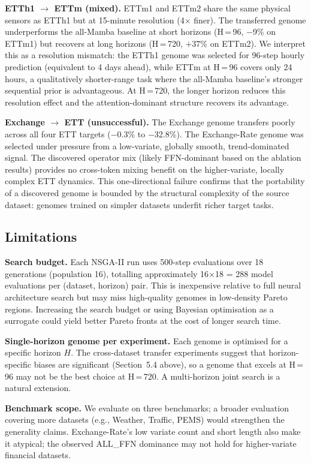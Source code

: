 \textbf{ETTh1 $\to$ ETTm (mixed).}
ETTm1 and ETTm2 share the same physical sensors as ETTh1 but at 15-minute resolution (4$\times$ finer).
The transferred genome underperforms the all-Mamba baseline at short horizons (H\,=\,96, $-$9\% on ETTm1) but recovers at long horizons (H\,=\,720, $+$37\% on ETTm2).
We interpret this as a resolution mismatch: the ETTh1 genome was selected for 96-step hourly prediction (equivalent to 4 days ahead), while ETTm at H\,=\,96 covers only 24 hours, a qualitatively shorter-range task where the all-Mamba baseline's stronger sequential prior is advantageous.
At H\,=\,720, the longer horizon reduces this resolution effect and the attention-dominant structure recovers its advantage.

\textbf{Exchange $\to$ ETT (unsuccessful).}
The Exchange genome transfers poorly across all four ETT targets ($-$0.3\% to $-$32.8\%).
The Exchange-Rate genome was selected under pressure from a low-variate, globally smooth, trend-dominated signal.
The discovered operator mix (likely FFN-dominant based on the ablation results) provides no cross-token mixing benefit on the higher-variate, locally complex ETT dynamics.
This one-directional failure confirms that the portability of a discovered genome is bounded by the structural complexity of the source dataset: genomes trained on simpler datasets underfit richer target tasks.

\subsection{Limitations}

\textbf{Search budget.}
Each NSGA-II run uses 500-step evaluations over 18 generations (population 16), totalling approximately 16$\times$18 = 288 model evaluations per (dataset, horizon) pair.
This is inexpensive relative to full neural architecture search but may miss high-quality genomes in low-density Pareto regions.
Increasing the search budget or using Bayesian optimisation as a surrogate could yield better Pareto fronts at the cost of longer search time.

\textbf{Single-horizon genome per experiment.}
Each genome is optimised for a specific horizon $H$.
The cross-dataset transfer experiments suggest that horizon-specific biases are significant (Section~5.4 above), so a genome that excels at H\,=\,96 may not be the best choice at H\,=\,720.
A multi-horizon joint search is a natural extension.

\textbf{Benchmark scope.}
We evaluate on three benchmarks; a broader evaluation covering more datasets (e.g., Weather, Traffic, PEMS) would strengthen the generality claims.
Exchange-Rate's low variate count and short length also make it atypical; the observed ALL\_FFN dominance may not hold for higher-variate financial datasets.

